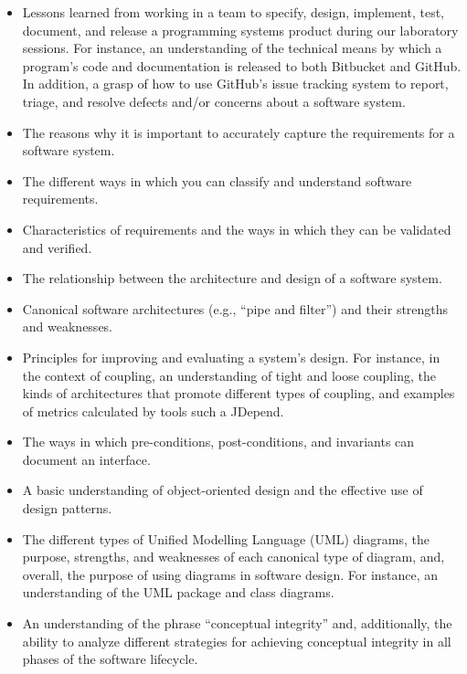 \begin{itemize}
  \item Lessons learned from working in a team to specify, design, implement, test, document, and release a programming
    systems product during our laboratory sessions. For instance, an understanding of the technical means by which a
    program's code and documentation is released to both Bitbucket and GitHub. In addition, a grasp of how to use
    GitHub's issue tracking system to report, triage, and resolve defects and/or concerns about a software system.

  \item The reasons why it is important to accurately capture the requirements for a software system.

  \item The different ways in which you can classify and understand software requirements.

  \item Characteristics of requirements and the ways in which they can be validated and verified.

  \item The relationship between the architecture and design of a software system.

  \item Canonical software architectures (e.g., ``pipe and filter'') and their strengths and weaknesses.

  \item Principles for improving and evaluating a system's design. For instance, in the context of coupling, an
    understanding of tight and loose coupling, the kinds of architectures that promote different types of coupling, and
    examples of metrics calculated by tools such a JDepend.

  \item The ways in which pre-conditions, post-conditions, and invariants can document an interface.

  \item A basic understanding of object-oriented design and the effective use of design patterns.

  \item The different types of Unified Modelling Language (UML) diagrams, the purpose, strengths, and weaknesses of each
    canonical type of diagram, and, overall, the purpose of using diagrams in software design. For instance, an
    understanding of the UML package and class diagrams.

  \item An understanding of the phrase ``conceptual integrity'' and, additionally, the ability to analyze different
    strategies for achieving conceptual integrity in all phases of the software lifecycle.


\end{itemize}
